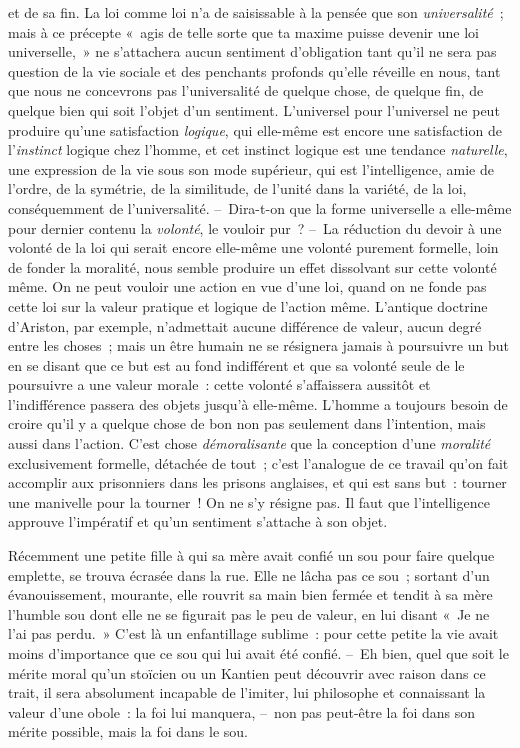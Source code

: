 \documentclass[french,twoside]{book} %
\begin{document}
et de sa fin. La loi comme loi n’a de saisissable à la pensée que son \emph{universalité} ; mais à ce précepte « agis de telle sorte que ta maxime puisse devenir une loi universelle, » ne s’attachera aucun sentiment d’obligation tant qu’il ne sera pas question de la vie sociale et des penchants profonds qu’elle réveille en nous, tant que nous ne concevrons pas l’universalité de quelque chose, de quelque fin, de quelque bien qui soit l’objet d’un sentiment. L’universel pour l’universel ne peut produire qu’une satisfaction \emph{logique}, qui elle-même est encore une satisfaction de l’\emph{instinct} logique chez l’homme, et cet instinct logique est une tendance \emph{naturelle}, une expression de la vie sous son mode supérieur, qui est l’intelligence, amie de l’ordre, de la symétrie, de la similitude, de l’unité dans la variété, de la loi, conséquemment de l’universalité. – Dira-t-on que la forme universelle a elle-même pour dernier contenu la \emph{volonté}, le vouloir pur ? – La réduction du devoir à une volonté de la loi qui serait encore elle-même une volonté purement formelle, loin de fonder la moralité, nous semble produire un effet dissolvant sur cette volonté même. On ne peut vouloir une action en vue d’une loi, quand on ne fonde pas cette loi sur la valeur pratique et logique de l’action même. L’antique doctrine d’Ariston, par exemple, n’admettait aucune différence de valeur, aucun degré entre les choses ; mais un être humain ne se résignera jamais à poursuivre un but en se disant que ce but est au fond indifférent et que sa volonté seule de le poursuivre a une valeur morale : cette volonté s’affaissera aussitôt et l’indifférence passera des objets jusqu’à elle-même. L’homme a toujours besoin de croire qu’il y a quelque chose de bon non pas seulement dans l’intention, mais aussi dans l’action. C’est chose \emph{démoralisante} que la conception d’une \emph{moralité} exclusivement formelle, détachée de tout ; c’est l’analogue de ce travail qu’on fait accomplir aux prisonniers dans les prisons anglaises, et qui est sans but : tourner une manivelle pour la tourner ! On ne s’y résigne pas. Il faut que l’intelligence approuve l’impératif et qu’un sentiment s’attache à son objet.\par
Récemment une petite fille à qui sa mère avait confié un sou pour faire quelque emplette, se trouva écrasée dans la rue. Elle ne lâcha pas ce sou ; sortant d’un évanouissement, mourante, elle rouvrit sa main bien fermée et tendit à sa mère l’humble sou dont elle ne se figurait pas le peu de valeur, en lui disant « Je ne l’ai pas perdu. » C’est là un enfantillage sublime : pour cette petite la vie avait moins d’importance que ce sou qui lui avait été confié. – Eh bien, quel que soit le mérite moral qu’un stoïcien ou un Kantien peut découvrir avec raison dans ce trait, il sera absolument incapable de l’imiter, lui philosophe et connaissant la valeur d’une obole : la foi lui manquera, – non pas peut-être la foi dans son mérite possible, mais la foi dans le sou.\par
\end{document}
